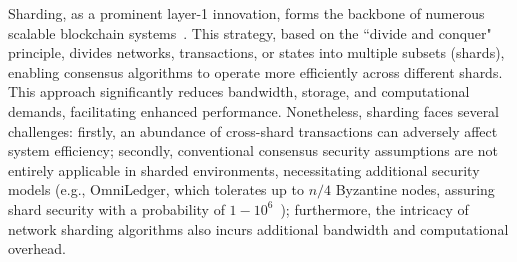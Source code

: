 \documentclass[conference]{IEEEtran}
\begin{document}

Sharding, as a prominent layer-1 innovation, forms the backbone of numerous scalable blockchain systems~\cite{OmniLedger,OHIE,RapidChain,Sharding2016,Chainspace,hong2021pyramid,crain2021red}. This strategy, based on the ``divide and conquer" principle, divides networks, transactions, or states into multiple subsets (shards), enabling consensus algorithms to operate more efficiently across different shards. This approach significantly reduces bandwidth, storage, and computational demands, facilitating enhanced performance. Nonetheless, sharding faces several challenges: firstly, an abundance of cross-shard transactions can adversely affect system efficiency; secondly, conventional consensus security assumptions are not entirely applicable in sharded environments, necessitating additional security models (e.g., OmniLedger, which tolerates up to \(n/4\) Byzantine nodes, assuring shard security with a probability of \(1-10^6\)~\cite{OmniLedger}); furthermore, the intricacy of network sharding algorithms also incurs additional bandwidth and computational overhead.


\end{document}
